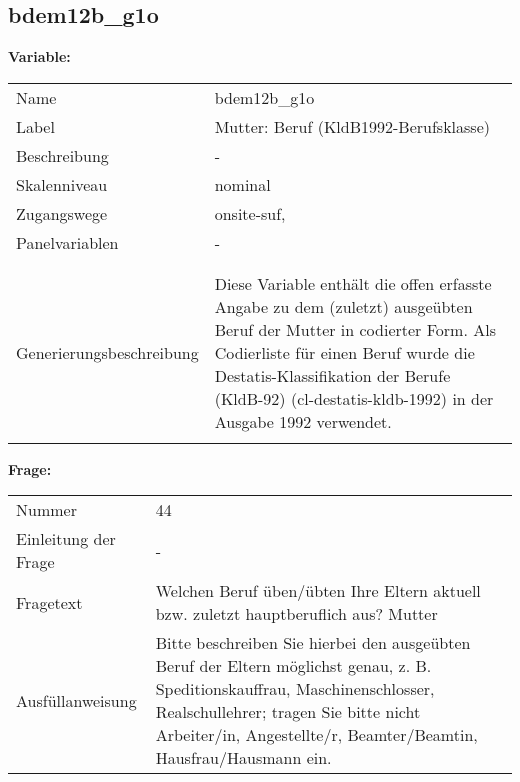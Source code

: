 	
	
	\subsection{bdem12b\_g1o}
	\label{subSection:bdem12b_g1o}

	\noindent\textbf{Variable:}\\
		\begin{tabular}{lL{11.3cm}}
			\label{tableVariable:bdem12b_g1o}
			Name & bdem12b\_g1o \\
			Label & Mutter: Beruf (KldB1992-Berufsklasse) \\
			Beschreibung & - \\
			Skalenniveau & nominal \\
			Zugangswege &
				onsite-suf,
 \\
			Panelvariablen & -
			 \\
			 \\
 \\
					Generierungsbeschreibung & Diese Variable enthält die offen erfasste Angabe zu dem (zuletzt) ausgeübten Beruf der Mutter in codierter Form. Als Codierliste für einen Beruf wurde die Destatis-Klassifikation der Berufe (KldB-92) (cl-destatis-kldb-1992) in der Ausgabe 1992 verwendet. 
				 \\	
			 \\
		\end{tabular}

		\vspace*{1 cm}
		\noindent\textbf{Frage:}\\
		\begin{tabular}{lL{11.3cm}}
			\label{tableQuestion:bdem12b_g1o}
			Nummer & 44 \\
			Einleitung der Frage & - \\
			Fragetext & Welchen Beruf üben/übten Ihre Eltern aktuell bzw. zuletzt hauptberuflich aus?
Mutter \\
			Ausfüllanweisung & Bitte beschreiben Sie hierbei den ausgeübten Beruf der Eltern möglichst genau, z. B. Speditionskauffrau, Maschinenschlosser, Realschullehrer; tragen Sie bitte nicht Arbeiter/in, Angestellte/r, Beamter/Beamtin, Hausfrau/Hausmann ein. \\
		\end{tabular}





